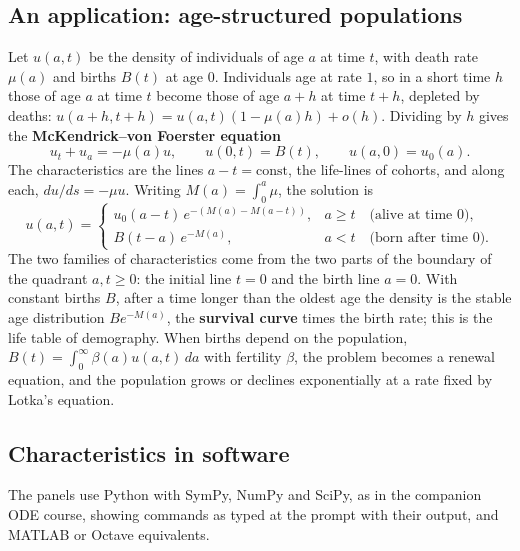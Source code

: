 \documentclass[11pt,a4paper]{article}
\numberwithin{equation}{section}
\theoremstyle{definition}
\begin{document}
\subsection{An application: age-structured populations}
\label{ssec:mckendrick}

Let $u(a, t)$ be the density of individuals of age $a$ at time $t$, with death rate $\mu(a)$ and births $B(t)$ at age $0$. Individuals age at rate $1$, so in a short time $h$ those of age $a$ at time $t$ become
those of age $a + h$ at time $t + h$, depleted by deaths: $u(a + h, t + h) = u(a, t)(1 - \mu(a)h) + o(h)$. Dividing by $h$ gives the \textbf{McKendrick--von Foerster equation}
\[
u_t + u_a = -\mu(a)u, \qquad u(0, t) = B(t), \qquad u(a, 0) = u_0(a) .
\]
The characteristics are the lines $a - t = \text{const}$, the life-lines of cohorts, and along each, $du/ds = -\mu u$. Writing $M(a) = \int_0^a\mu$, the solution is
\[
u(a, t) = \begin{cases} u_0(a - t)\,e^{-(M(a) - M(a - t))}, & a \geq t \quad\text{(alive at time } 0),\\ B(t - a)\,e^{-M(a)}, & a < t \quad\text{(born after time } 0). \end{cases}
\]
The two families of characteristics come from the two parts of the boundary of the quadrant $a, t \geq 0$: the initial line $t = 0$ and the birth line $a = 0$. With constant births $B$, after a time
longer than the oldest age the density is the stable age distribution $Be^{-M(a)}$, the \textbf{survival curve} times the birth rate; this is the life table of demography. When births depend on the
population, $B(t) = \int_0^\infty\beta(a)u(a, t)\,da$ with fertility $\beta$, the problem becomes a renewal equation, and the population grows or declines exponentially at a rate fixed by Lotka's equation.

\subsection{Characteristics in software}
\label{ssec:software1}

The panels use Python with SymPy, NumPy and SciPy, as in the companion ODE course, showing commands as typed at the prompt with their output, and MATLAB or Octave equivalents.
\end{document}
